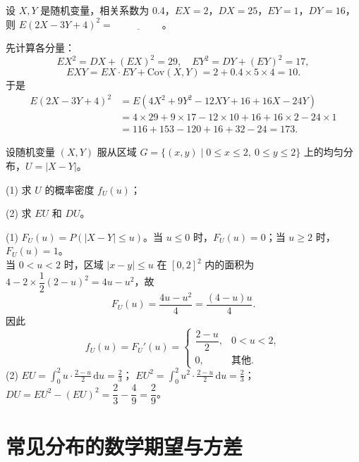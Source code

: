 \documentclass[lang=cn,11pt]{elegantbook}
\begin{document}
\begin{exercise}\label{exer:4-7-square}
设 \(X, Y\) 是随机变量，相关系数为 0.4，\(EX = 2\)，\(DX = 25\)，\(EY = 1\)，\(DY = 16\)，则 \(E(2X - 3Y + 4)^2 =\,\underline{\hspace{2cm}}\)。
\end{exercise}

\begin{solution}
先计算各分量：
\[
EX^2 = DX + (EX)^2 = 29,\quad EY^2 = DY + (EY)^2 = 17,
\]
\[
EXY = EX \cdot EY + \mathrm{Cov}(X,Y) = 2 + 0.4 \times 5 \times 4 = 10.
\]
于是
\[
\begin{aligned}
E(2X-3Y+4)^2 &= E(4X^2 + 9Y^2 - 12XY + 16 + 16X - 24Y) \\
&= 4 \times 29 + 9 \times 17 - 12 \times 10 + 16 + 16 \times 2 - 24 \times 1 \\
&= 116 + 153 - 120 + 16 + 32 - 24 = 173.
\end{aligned}
\]
\end{solution}


\begin{exercise}\label{exer:4-3-abs}
设随机变量 \((X,Y)\) 服从区域 \(G = \{(x,y) \mid 0 \leqslant x \leqslant 2,\ 0 \leqslant y \leqslant 2\}\) 上的均匀分布，\(U = |X-Y|\)。\par
(1) 求 \(U\) 的概率密度 \(f_U(u)\)；\par
(2) 求 \(EU\) 和 \(DU\)。
\end{exercise}
\begin{solution}
(1) \(F_U(u) = P(|X-Y| \leqslant u)\)。当 \(u \leqslant 0\) 时，\(F_U(u) = 0\)；当 \(u \geqslant 2\) 时，\(F_U(u) = 1\)。\\
当 \(0 < u < 2\) 时，区域 \(|x-y| \leqslant u\) 在 \([0,2]^2\) 内的面积为 \(4 - 2 \times \dfrac{1}{2}(2-u)^2 = 4u - u^2\)，故
\[
F_U(u) = \frac{4u - u^2}{4} = \frac{(4-u)u}{4}.
\]
因此
\[
f_U(u) = F_U'(u) = \begin{cases} \dfrac{2-u}{2}, & 0 < u < 2, \\[4pt] 0, & \text{其他}. \end{cases}
\]
(2) \(EU = \displaystyle\int_0^2 u \cdot \frac{2-u}{2}\,\mathrm{d}u = \frac{2}{3}\)；
\(EU^2 = \displaystyle\int_0^2 u^2 \cdot \frac{2-u}{2}\,\mathrm{d}u = \frac{2}{3}\)；
\(DU = EU^2 - (EU)^2 = \dfrac{2}{3} - \dfrac{4}{9} = \dfrac{2}{9}\)。
\end{solution}

\section{常见分布的数学期望与方差}
\end{document}

